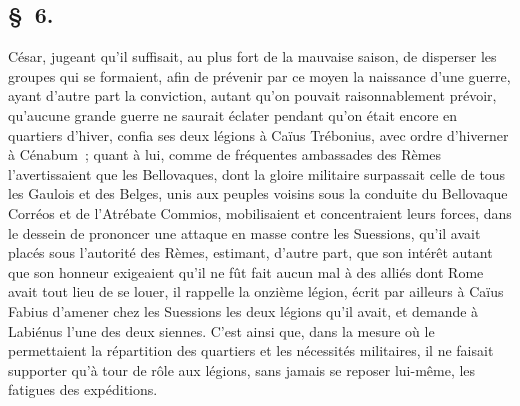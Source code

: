 \documentclass[french,twoside]{book} %
\begin{document}
\subsection[{§ 6.}]{ \textsc{§ 6.} }
\noindent César, jugeant qu’il suffisait, au plus fort de la mauvaise saison, de disperser les groupes qui se formaient, afin de prévenir par ce moyen la naissance d’une guerre, ayant d’autre part la conviction, autant qu’on pouvait raisonnablement prévoir, qu’aucune grande guerre ne saurait éclater pendant qu’on était encore en quartiers d’hiver, confia ses deux légions à Caïus Trébonius, avec ordre d’hiverner à Cénabum ; quant à lui, comme de fréquentes ambassades des Rèmes l’avertissaient que les Bellovaques, dont la gloire militaire surpassait celle de tous les Gaulois et des Belges, unis aux peuples voisins sous la conduite du Bellovaque Corréos et de l’Atrébate Commios, mobilisaient et concentraient leurs forces, dans le dessein de prononcer une attaque en masse contre les Suessions, qu’il avait placés sous l’autorité des Rèmes, estimant, d’autre part, que son intérêt autant que son honneur exigeaient qu’il ne fût fait aucun mal à des alliés dont Rome avait tout lieu de se louer, il rappelle la onzième légion, écrit par ailleurs à Caïus Fabius d’amener chez les Suessions les deux légions qu’il avait, et demande à Labiénus l’une des deux siennes. C'est ainsi que, dans la mesure où le permettaient la répartition des quartiers et les nécessités militaires, il ne faisait supporter qu’à tour de rôle aux légions, sans jamais se reposer lui-même, les fatigues des expéditions.
\end{document}
